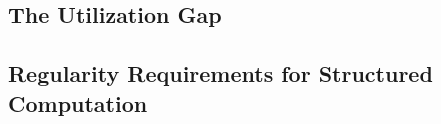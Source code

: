 \documentclass[sigconf, screen, review]{acmart}
\begin{document}

\subsection{The Utilization Gap}
\label{sec:bg-gap}

%

\subsection{Regularity Requirements for Structured Computation}
\label{sec:bg-regularity}


\end{document}
